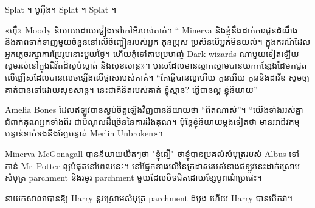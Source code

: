 Splat ។ ប៊ូអ៊ីង។ Splat ។ Splat ។

«ហ៊ឺ» Moody និយាយដោយផ្អៀងទៅកៅអីរបស់គាត់។ “ Minerva និងខ្ញុំនឹងដាក់ការជូនដំណឹង និងភាពទាក់ទាញមួយចំនួននៅលើចិញ្ចៀនរបស់អ្នក កូនប្រុស ប្រសិនបើអ្នកមិនយល់។ ក្នុងករណីដែលអ្នកភ្លេចរក្សាការប្រែរូបនោះមួយថ្ងៃ។ ហើយ​កុំ​ទៅ​តាម​ប្រមាញ់ Dark wizards ណា​មួយ​ទៀត​ឡើយ សូម​រស់​នៅ​ក្នុង​ជីវិត​ដ៏​ស្ងប់ស្ងាត់ និង​សុខសាន្ត»។ បុរស​ដែល​មាន​ស្លាកស្នាម​បាន​យក​កន្សែង​ដៃ​មក​ជូត​លើ​ញើស​ដែល​បាន​លេច​ឡើង​លើ​ថ្ងាស​របស់​គាត់។ “តែ​ធ្វើ​បាន​ល្អ​ហើយ កូន​អើយ កូន​និង​ដាវីឌ សូម​ឲ្យ​គាត់​បាន​ទៅ​ដោយ​សុខសាន្ត។ នេះ​ជា​គំនិត​របស់​គាត់ ខ្ញុំ​ស្មាន? ធ្វើបានល្អ ខ្ញុំនិយាយ”

Amelia Bones ដែល​ឥឡូវ​បាន​ស្ងប់​ចិត្ត​ឡើង​វិញ​បាន​និយាយ​ថា “ពិត​ណាស់”។ “យើងទាំងអស់គ្នាជំពាក់គុណអ្នកទាំងពីរ ជាបំណុលដ៏ច្រើននៃការដឹងគុណ។ ប៉ុន្តែ​ខ្ញុំ​និយាយ​ម្តង​ទៀត​ថា មាន​អាជីវកម្ម​បន្ទាន់​ទាក់ទង​នឹង​ខ្សែ​បន្ទាត់ Merlin Unbroken»។

Minerva McGonagall បាននិយាយយឺតៗថា "ខ្ញុំជឿ" ថាខ្ញុំបានប្រគល់សំបុត្ររបស់ Albus ទៅកាន់ Mr~Potter ល្អបំផុតនៅពេលនេះ។ នៅផ្នែកខាងលើនៃក្រដាសរបស់នាងឥឡូវនេះដាក់ស្រោមសំបុត្រ parchment និងរមូរ parchment មួយដែលបិទជិតដោយខ្សែបូពណ៌ប្រផេះ។

នាយកសាលាបានឱ្យ Harry នូវស្រោមសំបុត្រ parchment ដំបូង ហើយ Harry បានបើកវា។

\later

